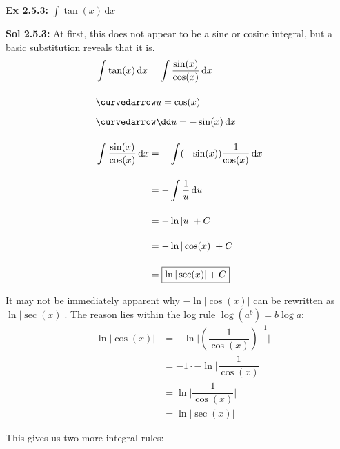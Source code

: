 \begin{tcolorbox}[example]
    \textbf{Ex 2.5.3: } $\int \tan (x) \,\mathrm{d}x$
\end{tcolorbox}
\begin{tcolorbox}[solution]
    \textbf{Sol 2.5.3: } At first, this does not appear to be a sine or cosine integral, but a basic substitution reveals that it is. \begin{align*}
        & \int \tan (x) \,\mathrm{d}x = \int \dfrac{\sin (x)}{\cos (x)} \,\mathrm{d}x \\[11pt]
        & \curvedarrow u = \cos (x) \\[5.5pt]
        & \curvedarrow \dd u = -\sin (x) \,\mathrm{d}x \\[11pt]
        & \int \dfrac{\sin (x)}{\cos (x)} \,\mathrm{d}x \begin{aligned}[t]
            & = -\int (-\sin(x))\dfrac{1}{\cos (x)} \,\mathrm{d}x \\[11pt]
            & = -\int \dfrac{1}{u} \,\mathrm{d}u \\[11pt]
            & = -\ln |u| + C \\[11pt]
            & = -\ln |\cos (x)| + C \\[11pt]
            & = \boxed{\ln |\sec (x)| + C}
        \end{aligned}
    \end{align*}
    \begin{tcolorbox}[interesting]
        It may not be immediately apparent why $-\ln |\cos (x)|$ can be rewritten as $\ln |\sec (x)|$. The reason lies within the log rule $\log \left(a^b\right) = b\log a$: \begin{align*}
            -\ln |\cos (x)| &= -\ln \bigg|\left(\dfrac{1}{\cos (x)}\right)^{-1}\bigg| \\[11pt]
            & = -1 \cdot -\ln \bigg|\dfrac{1}{\cos (x)}\bigg| \\[11pt]
            & = \ln \bigg|\dfrac{1}{\cos (x)}\bigg| \\[11pt]
            & = \ln |\sec (x)|
        \end{align*}
    \end{tcolorbox}
\end{tcolorbox}

This gives us two more integral rules: \par

 \vspace{11pt}

